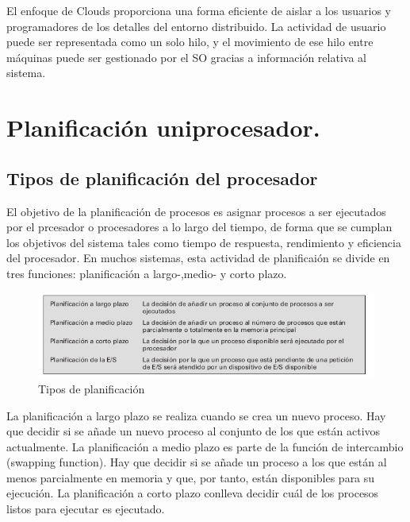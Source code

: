 \documentclass{article}
\begin{document}
					El enfoque de Clouds proporciona una forma eficiente de aislar a los usuarios y programadores de los detalles del entorno distribuido. La actividad de usuario puede ser representada como un solo hilo, y el movimiento de ese hilo entre máquinas puede ser gestionado por el SO gracias a información relativa al sistema.
					
		\section{Planificación uniprocesador.}
			\subsection{Tipos de planificación del procesador}
				El objetivo de la planificación de procesos es asignar procesos a ser ejecutados por el prcesador o procesadores a lo largo del tiempo, de forma que se cumplan los objetivos del sistema tales como tiempo de respuesta, rendimiento y eficiencia del procesador. En muchos sistemas, esta actividad de planificaión se divide en tres funciones: planificación a largo-,medio- y corto plazo.
				
				\begin{figure}
				\caption{Tipos de planificación}
				\label{figura2.20:tiposplanifición}
				\centering
				\includegraphics[width=1\textwidth, scale=1]{tema_2_figura20.png}
				\end{figure}
				
				La planificación a largo plazo se realiza cuando se crea un nuevo proceso. Hay que decidir si se añade un nuevo proceso al conjunto de los que están activos actualmente. La planificación a medio plazo es parte de la función de intercambio (swapping function). Hay que decidir si se añade un proceso a los que están al menos parcialmente en memoria y que, por tanto, están disponibles para su ejecución. La planificación a corto plazo conlleva decidir cuál de los procesos listos para ejecutar es ejecutado.
				
\end{document}
